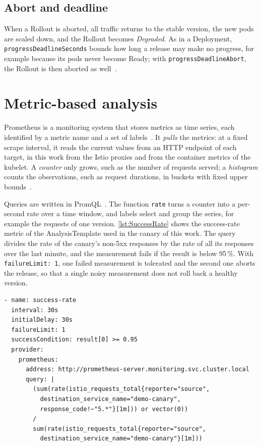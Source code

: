 \subsection{Abort and deadline}
\label{sec:ArgoRolloutsAbort}
When a Rollout is aborted, all traffic returns to the stable version, the new pods are scaled down, and the Rollout becomes \emph{Degraded}. As in a Deployment, \texttt{progressDeadlineSeconds} bounds how long a release may make no progress, for example because its pods never become Ready; with \texttt{progressDeadlineAbort}, the Rollout is then aborted as well~\cite{ArgoRolloutsSpec}.

\section{Metric-based analysis}
\label{sec:MetricAnalysis}
Prometheus is a monitoring system that stores metrics as time series, each identified by a metric name and a set of labels~\cite{PromOverview}. It \emph{pulls} the metrics: at a fixed scrape interval, it reads the current values from an HTTP endpoint of each target, in this work from the Istio proxies and from the container metrics of the kubelet. A \emph{counter} only grows, such as the number of requests served; a \emph{histogram} counts the observations, such as request durations, in buckets with fixed upper bounds~\cite{PromMetricTypes}.

Queries are written in PromQL~\cite{PromQL}. The function \texttt{rate} turns a counter into a per-second rate over a time window, and labels select and group the series, for example the requests of one version. \autoref{lst:SuccessRate} shows the success-rate metric of the AnalysisTemplate used in the canary of this work. The query divides the rate of the canary's non-5xx responses by the rate of all its responses over the last minute, and the measurement fails if the result is below 95\,\%. With \texttt{failureLimit: 1}, one failed measurement is tolerated and the second one aborts the release, so that a single noisy measurement does not roll back a healthy version.

\begin{lstlisting}[float=!ht,caption={Success-rate metric of the canary-health AnalysisTemplate.},label=lst:SuccessRate]
- name: success-rate
  interval: 30s
  initialDelay: 30s
  failureLimit: 1
  successCondition: result[0] >= 0.95
  provider:
    prometheus:
      address: http://prometheus-server.monitoring.svc.cluster.local
      query: |
        (sum(rate(istio_requests_total{reporter="source",
          destination_service_name="demo-canary",
          response_code!~"5.*"}[1m])) or vector(0))
        /
        sum(rate(istio_requests_total{reporter="source",
          destination_service_name="demo-canary"}[1m]))
\end{lstlisting}

